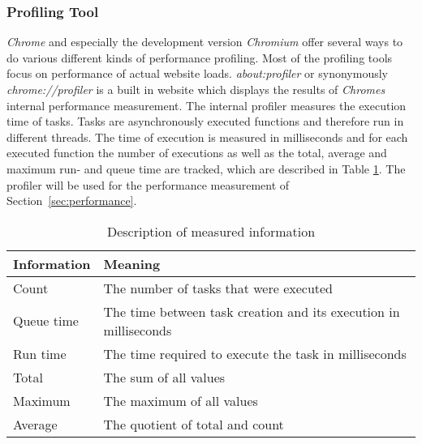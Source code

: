 \subsubsection{Profiling Tool}
\label{sec:profiler}
\emph{Chrome} and especially the development version \emph{Chromium} offer several ways to do various different kinds of performance profiling. Most of the profiling tools focus on performance of actual website loads. \emph{about:profiler} or synonymously \emph{chrome://profiler} is a built in website which displays the results of \emph{Chromes} internal performance measurement. The internal profiler measures the execution time of tasks. Tasks are asynchronously executed functions and therefore run in different threads. The time of execution is measured in milliseconds and for each executed function the number of executions as well as the total, average and maximum run- and queue time are tracked, which are described in Table \ref{fig:ex1_info}. The profiler will be used for the performance measurement of Section~\ref{sec:performance}.
\begin{table}
\caption{Description of measured information}
\label{fig:ex1_info}
\begin{tabularx}{\textwidth}{|l|X|}
\hline
Information & Meaning \\ \hline
Count & The number of tasks that were executed \\ \hline
Queue time & The time between task creation and its execution in milliseconds \\ \hline
Run time & The time required to execute the task in milliseconds \\ \hline
Total & The sum of all values \\ \hline
Maximum & The maximum of all values \\ \hline
Average & The quotient of total and count \\ \hline
\end{tabularx}
\end{table}